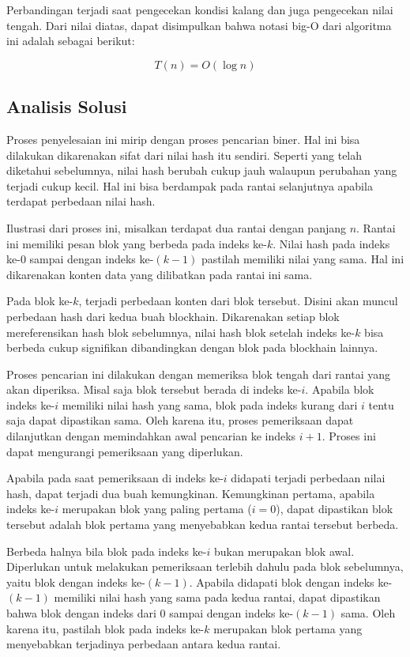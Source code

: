 \documentclass[10pt,conference]{IEEEtran}
\theoremstyle{definition}
\begin{document}
Perbandingan terjadi saat pengecekan kondisi kalang dan juga pengecekan nilai tengah. Dari nilai diatas, dapat disimpulkan bahwa notasi big-O dari algoritma ini adalah sebagai berikut:

$$
T(n) = O(\log n)
$$

\subsection{Analisis Solusi}
Proses penyelesaian ini mirip dengan proses pencarian biner. Hal ini bisa dilakukan dikarenakan sifat dari nilai hash itu sendiri. Seperti yang telah diketahui sebelumnya, nilai hash berubah cukup jauh walaupun perubahan yang terjadi cukup kecil. Hal ini bisa berdampak pada rantai selanjutnya apabila terdapat perbedaan nilai hash.

Ilustrasi dari proses ini, misalkan terdapat dua rantai dengan panjang $n$. Rantai ini memiliki pesan blok yang berbeda pada indeks ke-$k$. Nilai hash pada indeks ke-0 sampai dengan indeks ke-$(k-1)$ pastilah memiliki nilai yang sama. Hal ini dikarenakan konten data yang dilibatkan pada rantai ini sama. 

Pada blok ke-$k$, terjadi perbedaan konten dari blok tersebut. Disini akan muncul perbedaan hash dari kedua buah blockhain. Dikarenakan setiap blok mereferensikan hash blok sebelumnya, nilai hash blok setelah indeks ke-$k$ bisa berbeda cukup signifikan dibandingkan dengan blok pada blockhain lainnya. 

Proses pencarian ini dilakukan dengan memeriksa blok tengah dari rantai yang akan diperiksa. Misal saja blok tersebut berada di indeks ke-$i$. Apabila blok indeks ke-$i$ memiliki nilai hash yang sama, blok pada indeks kurang dari $i$ tentu saja dapat dipastikan sama. Oleh karena itu, proses pemeriksaan dapat dilanjutkan dengan memindahkan awal pencarian ke indeks $i+1$. Proses ini dapat mengurangi pemeriksaan yang diperlukan.

Apabila pada saat pemeriksaan di indeks ke-$i$ didapati terjadi perbedaan nilai hash, dapat terjadi dua buah kemungkinan. Kemungkinan pertama, apabila indeks ke-$i$ merupakan blok yang paling pertama ($i=0$), dapat  dipastikan blok tersebut adalah blok pertama yang menyebabkan kedua rantai tersebut berbeda.

Berbeda halnya bila blok pada indeks ke-$i$ bukan merupakan blok awal. Diperlukan untuk melakukan pemeriksaan terlebih dahulu pada blok sebelumnya, yaitu blok dengan indeks ke-$(k-1)$. Apabila didapati blok dengan indeks ke-$(k-1)$ memiliki nilai hash yang sama pada kedua rantai, dapat dipastikan bahwa blok dengan indeks dari 0 sampai dengan indeks ke-$(k-1)$ sama. Oleh karena itu, pastilah blok pada indeks ke-$k$ merupakan blok pertama yang menyebabkan terjadinya perbedaan antara kedua rantai.
\end{document}
